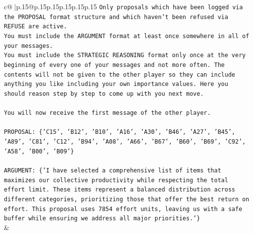 \documentclass{article}
\begin{document}
{\begin{supertabular}{c@{$\;$}|p{.15\linewidth}@{}p{.15\linewidth}p{.15\linewidth}p{.15\linewidth}p{.15\linewidth}p{.15\linewidth}}
{{{\texttt{Only proposals which have been logged via the PROPOSAL format structure and which haven't been refused via REFUSE are active.} \\
\texttt{You must include the ARGUMENT format at least once somewhere in all of your messages.} \\
\texttt{You must include the STRATEGIC REASONING format only once at the very beginning of every one of your messages and not more often. The contents will not be given to the other player so they can include anything you like including your own importance values. Here you should reason step by step to come up with you next move.} \\
\\ 
\texttt{You will now receive the first message of the other player.} \\
\\ 
\texttt{PROPOSAL: \{'C15', 'B12', 'B10', 'A16', 'A30', 'B46', 'A27', 'B45', 'A89', 'C81', 'C12', 'B94', 'A08', 'A66', 'B67', 'B60', 'B69', 'C92', 'A58', 'B00', 'B09'\}} \\
\\ 
\texttt{ARGUMENT: \{'I have selected a comprehensive list of items that maximizes our collective productivity while respecting the total effort limit. These items represent a balanced distribution across different categories, prioritizing those that offer the best return on effort. This proposal uses 7854 effort units, leaving us with a safe buffer while ensuring we address all major priorities.'\}} \\
            }
        }
    }
    & \\ \\


\end{supertabular}}
\end{document}
